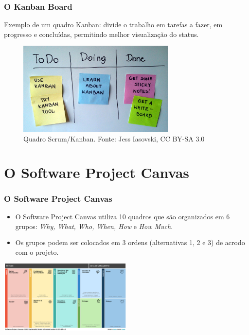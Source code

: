 \documentclass[aspectratio=169]{beamer}
\begin{document}
\begin{frame}
\frametitle{O Kanban Board}
Exemplo de um quadro Kanban: divide o trabalho em tarefas a fazer, em progresso e concluídas, permitindo melhor visualização do status.
\begin{figure}
    \centering
    \includegraphics[width=0.7\textwidth]{imagens/Simple-kanban-board-.jpg}
    \caption{Quadro Scrum/Kanban. Fonte: Jess Iasovski, CC BY-SA 3.0}
\end{figure}
\end{frame}


\section{O Software Project Canvas}

\begin{frame}
\frametitle{O Software Project Canvas}
\begin{itemize}
    \item O Software Project Canvas utiliza 10 quadros que são organizados em 6 grupos: \textit{Why, What, Who, When, How} e \textit{How Much}.
\item Os grupos podem ser colocados em 3 ordens (alternativas 1, 2 e 3) de acrodo com o projeto.
\end{itemize}

\centering
\includegraphics[width=0.5\textwidth]{dist/alternativa2.png}

\end{frame}
\end{document}
